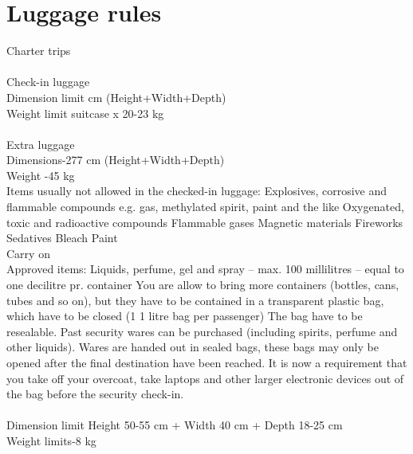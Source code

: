 \section{Luggage rules}
Charter trips\\
\\
Check-in luggage\\
Dimension limit\indent\indent{} cm (Height+Width+Depth)
\\
Weight limit\indent\indent\indent{} suitcase x 20-23 kg
\\
\\
Extra luggage\\
Dimensions\indent\indent\indent{}-277 cm (Height+Width+Depth)\\
Weight \indent\indent\indent \indent{}-45 kg
\\
Items usually not allowed in the checked-in luggage:
Explosives, corrosive and flammable compounds e.g. gas, methylated spirit, paint and the like  
Oxygenated, toxic and radioactive compounds 
Flammable gases 
Magnetic materials 
Fireworks 
Sedatives 
Bleach 
Paint
\\
Carry on\\
Approved items: Liquids, perfume, gel and spray – max. 100 millilitres – equal to one decilitre pr. container
You are allow to bring more containers (bottles, cans, tubes and so on), but they have to be contained in a transparent plastic bag, which have to be closed (1 1 litre bag per passenger)
The bag have to be resealable.
Past security wares can be purchased (including spirits, perfume and other liquids). Wares are handed out in sealed bags, these bags may only be opened after the final destination have been reached.
It is now a requirement that you take off your overcoat, take laptops and other larger electronic devices out of the bag before the security check-in.
\\
\\
Dimension limit \indent\indent\indent	Height 50-55 cm + Width 40 cm + Depth 18-25 cm
\\
Weight limits\indent\indent\indent{}-8 kg